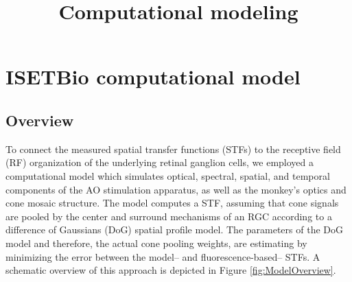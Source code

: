 \documentclass[11pt, oneside]{article}   	%
\title{Computational modeling}
\author{}
\date{}							%
\begin{document}
\maketitle
\section{ISETBio computational model}
\subsection{Overview}
To connect the measured spatial transfer functions (STFs) to the receptive field (RF) organization of the underlying retinal ganglion cells, we employed a computational model which simulates optical, spectral, spatial, and temporal components of the AO stimulation apparatus, as well as the monkey's optics and cone mosaic structure. The model computes a STF, assuming that cone signals are pooled by the center and surround mechanisms of an RGC according to a difference of Gaussians (DoG) spatial profile model. The parameters of the DoG model and therefore, the actual cone pooling weights, are estimating by minimizing the error between the model-- and fluorescence-based-- STFs. A schematic overview of this approach is depicted in Figure \ref{fig:ModelOverview}.
\end{document}
